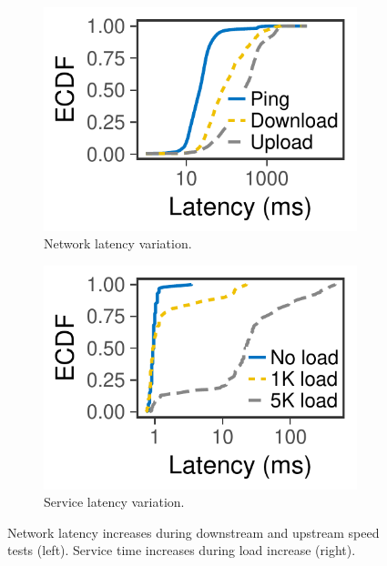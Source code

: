 \begin{figure}
  \centering
  \begin{subfigure}[t]{0.4\columnwidth}
    \centering
    \includegraphics[width=\textwidth]{figures/fcc_latency.pdf}
    \caption{Network latency variation.}
    \label{fig:fcc-latency}
  \end{subfigure}
  \hspace{2em}
  \begin{subfigure}[t]{0.4\columnwidth}
    \centering
    \includegraphics[width=\textwidth]{figures/tf_latency.pdf}
    \caption{Service latency variation.}
    \label{fig:tf-latency}
  \end{subfigure}
  \caption{Network latency increases during downstream and upstream speed tests
    (left). Service time increases during load increase (right).}
\end{figure}

